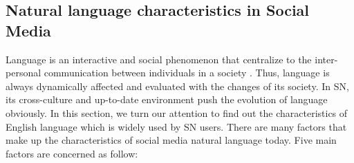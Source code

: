 \documentclass{llncs}
\begin{document}
\subsection{Natural language characteristics in Social Media }
\label{NLPSM}

Language is an interactive and social phenomenon that centralize to the inter-personal communication between individuals in a society \cite{duranti1992rethinking}. Thus, language is always dynamically affected and evaluated with the changes of its society. In SN, its cross-culture and up-to-date environment push the evolution of language obviously. In this section, we turn our attention to find out the characteristics of English language which is widely used by SN users. There are many factors that make up the characteristics of social media natural language today. Five main factors are concerned as follow:
\end{document}
